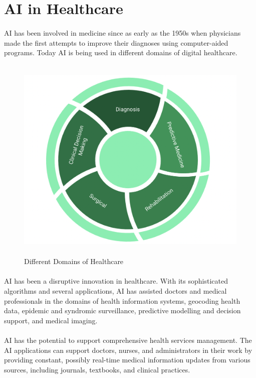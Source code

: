 \documentclass[12pt]{article}
\begin{document}
\newpage

\section{AI in Healthcare}
\paragraph{}
AI has been involved in medicine since as early as the 1950s when physicians made the first attempts to improve their diagnoses using computer-aided programs. Today AI is being used in different domains of digital healthcare.\cite{Silvana Secinaro}\\

\begin{figure}[h]
	\begin{center}
\includegraphics[height=10cm,width=13cm]{HealthSectors}
\end{center}
\caption{Different Domains of Healthcare}
\end{figure}


\paragraph{}
AI has been a disruptive innovation in healthcare. With its sophisticated algorithms and
several applications, AI has assisted doctors and medical professionals in the domains of health information systems, geocoding health data, epidemic and syndromic surveillance, predictive modelling and decision support, and medical imaging.

\paragraph{}
AI has the potential to support comprehensive health services management. The AI applications can support doctors, nurses, and administrators in their work by providing constant, possibly real-time medical information updates from various sources, including journals, textbooks, and clinical practices. 
\end{document}

